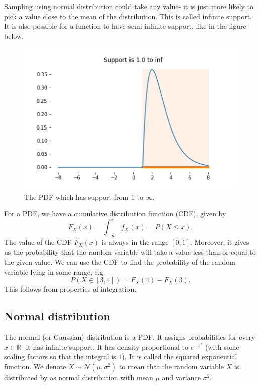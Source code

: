 \documentclass[a4paper, openany]{memoir}
\begin{document}
\noindent Sampling using normal distribution could take any value- it is just more likely to pick a value close to the mean of the distribution. This is called infinite support. It is also possible for a function to have semi-infinite support, like in the figure below.
\begin{figure}[H]
    \centering
    \includegraphics[scale=0.5]{src/5.15 semi infinite support.png}
    \caption{The PDF which has support from 1 to $\infty$.}
\end{figure}

For a PDF, we have a cumulative distribution function (CDF), given by
\[F_X(x) = \int_{-\infty}^x f_X(x) = P(X \leq x).\]
The value of the CDF $F_X(x)$ is always in the range $[0, 1]$. Moreover, it gives us the probability that the random variable will take a value less than or equal to the given value. We can use the CDF to find the probability of the random variable lying in some range, e.g.
\[P(X \in [3, 4]) = F_X(4) - F_X(3).\]
This follows from properties of integration.

\subsection{Normal distribution}
The normal (or Gaussian) distribution is a PDF. It assigns probabilities for every $x \in \mathbb{R}$- it has infinite support. It has density proportional to $e^{-x^2}$ (with some scaling factors so that the integral is $1$). It is called the squared exponential function. We denote $X \sim \mathcal{N}(\mu, \sigma^2)$ to mean that the random variable $X$ is distributed by as normal distribution with mean $\mu$ and variance $\sigma^2$. 
\end{document}
